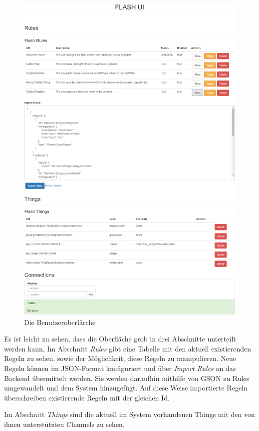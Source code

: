 \begin{figure}[h]
	\centering
	\includegraphics[width=\textwidth]{bilder/gui_all4}
	\caption{Die Benutzeroberlärche}
	\label{fig:gui_all}
\end{figure}

Es ist leicht zu sehen, dass die Oberfläche grob in drei Abschnitte unterteilt werden kann. Im Abschnitt \textit{Rules} gibt eine Tabelle mit den aktuell existierenden Regeln zu sehen, sowie der Möglichkeit, diese Regeln zu manipulieren. Neue Regeln können im JSON-Format konfiguriert und über \textit{Import Rules} an das Backend übermittelt werden. Sie werden daraufhin mithilfe von GSON\cite{gson} zu Rules umgewandelt und dem System hinzugefügt. Auf diese Weise importierte Regeln überschreiben existierende Regeln mit der gleichen Id.

Im Abschnitt \textit{Things} sind die aktuell im System vorhandenen Things mit den von ihnen unterstützten Channels zu sehen. 

